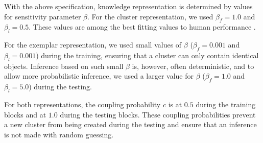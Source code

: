 \documentclass[doc]{apa6}
\begin{document}
With the above specification, knowledge representation is determined by values for sensitivity
parameter $\beta$.  For the cluster representation, we used $\beta_{f}=1.0$ and $\beta_{l}=0.5$.
These values are among the best fitting values to human performance \parencite{Sanborn2010a}.

For the exemplar representation, we used small values of $\beta$ ($\beta_{f}=0.001$ and
$\beta_{l}=0.001$) during the training, ensuring that a cluster can only contain identical objects.
Inference based on such small $\beta$ is, however, often deterministic, and to allow more
probabilistic inference, we used a larger value for $\beta$ ($\beta_{f}=1.0$ and $\beta_{l}=5.0$)
during the testing.

For both representations, the coupling probability $c$ is at $0.5$ during the training blocks and at
$1.0$ during the testing blocks. These coupling probabilities prevent a new cluster from being
created during the testing and ensure that an inference is not made with random guessing.



\end{document}
